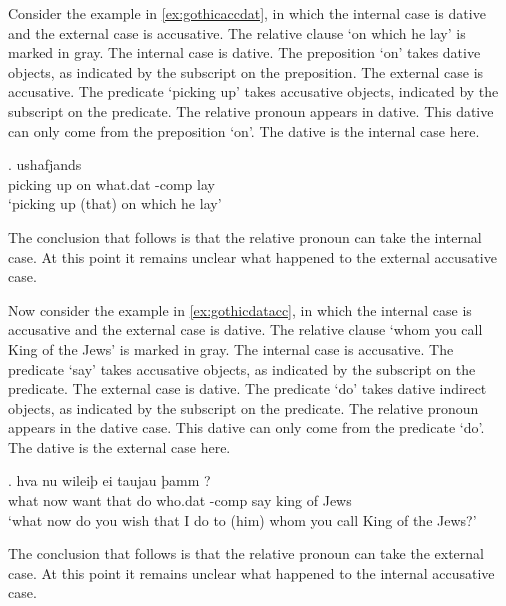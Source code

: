 Consider the example in \ref{ex:gothicaccdat}, in which the internal case is dative and the external case is accusative. The relative clause  `on which he lay' is marked in gray.
The internal case is dative. The preposition  `on' takes dative objects, as indicated by the subscript on the preposition.
The external case is accusative. The predicate  `picking up' takes accusative objects, indicated by the subscript on the predicate.
The relative pronoun  appears in dative. This dative can only come from the preposition  `on'. The dative is the internal case here.

\exg. ushafjands    \\
 {picking up}\scsub{[acc]} on\scsub{[dat]} what.\ac{dat} -\ac{comp} lay\\
 `picking up (that) on which he lay' \label{ex:gothicaccdat}

The conclusion that follows is that the relative pronoun can take the internal case. At this point it remains unclear what happened to the external accusative case.

Now consider the example in \ref{ex:gothicdatacc}, in which the internal case is accusative and the external case is dative. The relative clause  `whom you call King of the Jews' is marked in gray.
The internal case is accusative. The predicate  `say' takes accusative objects, as indicated by the subscript on the predicate.
The external case is dative. The predicate  `do' takes dative indirect objects, as indicated by the subscript on the predicate.
The relative pronoun  appears in the dative case. This dative can only come from the predicate  `do'. The dative is the external case here.

\exg. hva nu wileiþ ei taujau þamm    ?\\
 what now want that do\scsub{[dat]} who.\ac{dat} -\ac{comp} say\scsub{[acc]} king {of Jews}\\
 `what now do you wish that I do to (him) whom you call King of the Jews?' \label{ex:gothicdatacc}

The conclusion that follows is that the relative pronoun can take the external case. At this point it remains unclear what happened to the internal accusative case.

